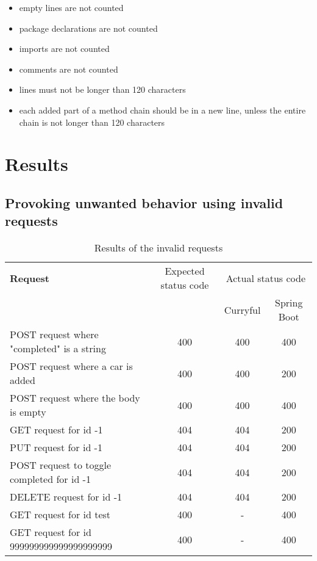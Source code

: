 \documentclass[a4paper]{article}
\begin{document}
\begin{itemize}
	\item empty lines are not counted
	\item package declarations are not counted
	\item imports are not counted
	\item comments are not counted
	\item lines must not be longer than 120 characters
	\item each added part of a method chain should be in a new line, unless
	      the entire chain is not longer than 120 characters
\end{itemize}

\newpage

\section{Results}
\subsection{Provoking unwanted behavior using invalid requests}
\begin{table}[h!]
	\begin{tabularx}{\textwidth}{|X|c|c|c|}
		\hline
		\textbf{Request}                           & Expected status code & \multicolumn{2}{c|}{Actual status code}               \\
		                                           &                      & Curryful                                & Spring Boot \\
		\hline
		POST request where "completed" is a string & 400                  & 400                                     & 400         \\
		POST request where a car is added          & 400                  & 400                                     & 200         \\
		POST request where the body is empty       & 400                  & 400                                     & 400         \\
		GET request for id -1                      & 404                  & 404                                     & 200         \\
		PUT request for id -1                      & 404                  & 404                                     & 200         \\
		POST request to toggle completed for id -1 & 404                  & 404                                     & 200         \\
		DELETE request for id -1                   & 404                  & 404                                     & 200         \\
		GET request for id test                    & 400                  & -                                       & 400         \\
		GET request for id 999999999999999999999   & 400                  & -                                       & 400         \\
		\hline
	\end{tabularx}
	\caption{Results of the invalid requests}
\end{table}
\end{document}
